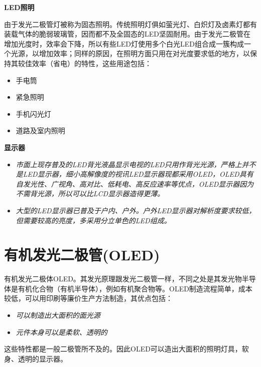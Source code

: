 \documentclass{beamer}
\newenvironment{slide}{
    \begin{frame}{\bfseries{\sectiontitle}}
}{
    \end{frame}
}
\let\sectiononly\section
\renewcommand{\section}[1]{
    \sectiononly{#1}
    \let\sectiontitle\relax
    \newcommand{\sectiontitle}{#1}
}
\begin{document}
\begin{slide}
    \textbf{LED照明}

    由于发光二极管灯被称为固态照明。传统照明灯俱如萤光灯、白炽灯及卤素灯都有装载气体的脆弱玻璃管，因而都不及全固态的LED坚固耐用。由于发光二极管在增加光度时，效率会下降，所以有些LED灯使用多个白光LED组合成一簇构成一个光源，以增加效率；同样的原因，在照明方面只用在对光度要求低的地方，以保持其较佳效率（省电）的特性，这些用途包括：
    \begin{itemize}
        \item 手电筒
        \item 紧急照明
        \item 手机闪光灯
        \item 道路及室内照明
    \end{itemize}
\end{slide}

\begin{slide}
\textbf{显示器}
\begin{itemize}
    \item \textit{市面上现存普及的LED背光液晶显示电视的LED只用作背光光源，严格上并不是LED显示器，细小高解像度的视讯LED显示器现都采用OLED，OLED具有自发光性、广视角、高对比、低耗电、高反应速率等优点，OLED显示器因为不需背光源，所以可以比LCD显示器造得更薄。}
    \item \textit{大型的LED显示器已普及于户内、户外。户外LED显示器对解析度要求较低，但需要较高的亮度，多采用分立单色的LED组成。}
\end{itemize}
\end{slide}

\section{有机发光二极管(OLED)}
\begin{slide}
有机发光二极体OLED。其发光原理跟发光二极管一样，不同之处是其发光物半导体是有机化合物（有机半导体），例如有机聚合物等。OLED制造流程简单，成本较低，可以用印刷等廉价生产方法制造，其优点包括：
\begin{itemize}
    \item \textit{可以制造出大面积的面光源}
    \item \textit{元件本身可以是柔软、透明的}
\end{itemize}
这些特性都是一般二极管所不及的。因此OLED可以造出大面积的照明灯具，软身、透明的显示器。
\end{slide}
\end{document}

